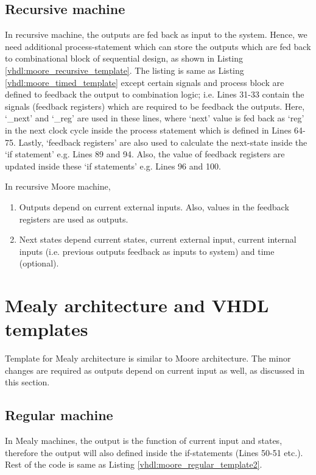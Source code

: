 \subsection{Recursive machine}
In recursive machine, the outputs are fed back as input to the system. Hence, we need additional process-statement which can store the outputs which are fed back to combinational block of sequential design, as shown in Listing \ref{vhdl:moore_recursive_template}. The listing is same as Listing \ref{vhdl:moore_timed_template} except certain signals and process block are defined to feedback the output to combination logic; i.e. Lines 31-33 contain the signals (feedback registers) which are required to be feedback the outputs. Here, `\_next' and `\_reg' are used in these lines, where `next' value is fed back as `reg' in the next clock cycle inside the process statement which is defined in Lines 64-75. Lastly, `feedback registers' are also used to calculate the next-state inside the `if statement' e.g. Lines 89 and 94. Also, the value of feedback registers are updated inside these `if statements' e.g. Lines 96 and 100. 

\begin{noNumBox}
	In recursive Moore machine, 
	\begin{enumerate}
		\item Outputs depend on current external inputs. Also, values in the feedback registers are used as outputs.
		\item Next states depend current states, current external input, current internal inputs (i.e. previous outputs feedback as inputs to system) and time (optional).
	\end{enumerate}
\end{noNumBox}





\section{Mealy architecture and VHDL templates} \label{sec:MealyTemplates}
Template for Mealy architecture is similar to Moore architecture. The minor changes are required as outputs depend on current input as well, as discussed in this section.
\subsection{Regular machine}
In Mealy machines, the output is the function of current input and states, therefore the output will also defined inside the if-statements (Lines 50-51 etc.). Rest of the code is same as Listing \ref{vhdl:moore_regular_template2}. 



